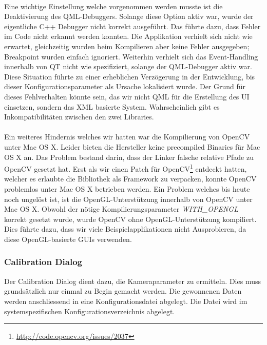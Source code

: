 \documentclass[main.tex]{subfiles}
\begin{document}
\paragraph{}
Eine wichtige Einstellung welche vorgenommen werden musste ist die Deaktivierung des QML-Debuggers. Solange diese Option aktiv war, wurde der eigentliche C++ Debugger nicht korrekt ausgeführt. Das führte dazu, dass Fehler im Code nicht erkannt werden konnten. Die Applikation verhielt sich nicht wie erwartet, gleichzeitig wurden beim Kompilieren aber keine Fehler ausgegeben; Breakpoint wurden einfach ignoriert. Weiterhin verhielt sich das Event-Handling innerhalb von QT nicht wie spezifiziert, solange der QML-Debugger aktiv war. Diese Situation führte zu einer erheblichen Verzögerung in der Entwicklung, bis dieser Konfigurationsparameter als Ursache lokalisiert wurde. Der Grund für dieses Fehlverhalten könnte sein, das wir nicht QML für die Erstellung des UI einsetzen, sondern das XML basierte System. Wahrscheinlich gibt es Inkompatibilitäten zwischen den zwei Libraries.
\paragraph{}
Ein weiteres Hindernis welches wir hatten war die Kompilierung von OpenCV unter Mac OS X. Leider bieten die Hersteller keine precompiled Binaries für Mac OS X an. Das Problem bestand darin, dass der Linker falsche relative Pfade zu OpenCV gesetzt hat. Erst als wir einen Patch für OpenCV\footnote{\url{http://code.opencv.org/issues/2037}} entdeckt hatten, welcher es erlaubte die Bibliothek als Framework zu verpacken, konnte OpenCV problemlos unter Mac OS X betrieben werden. Ein Problem welches bis heute noch ungelöst ist, ist die OpenGL-Unterstützung innerhalb von OpenCV unter Mac OS X. Obwohl der nötige Kompilierungsparameter \textit{WITH\_OPENGL} korrekt gesetzt wurde, wurde OpenCV ohne OpenGL-Unterstützung kompiliert. Dies führte dazu, dass wir viele Beispielapplikationen nicht Ausprobieren, da diese OpenGL-basierte GUIs verwenden.

\subsubsection{Calibration Dialog}
Der Calibration Dialog dient dazu, die Kameraparameter zu ermitteln. Dies muss grundsätzlich nur einmal zu Begin gemacht werden. Die gewonnenen Daten werden anschliessend in eine Konfigurationsdatei abgelegt. Die Datei wird im systemspezifischen Konfigurationsverzeichnis abgelegt.
\end{document}
